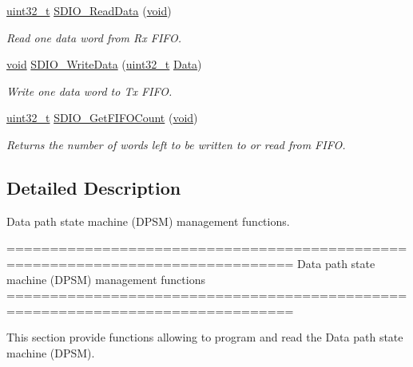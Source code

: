 \begin{DoxyCompactItemize}
\hyperlink{stdint_8h_a435d1572bf3f880d55459d9805097f62}{uint32\-\_\-t} \hyperlink{group___s_d_i_o___group3_ga4e8ac755ef3c31ecd4ed2708df19187e}{S\-D\-I\-O\-\_\-\-Read\-Data} (\hyperlink{group___n_a_m_e_ga18028b8badbf1ea7e704ccac3c488e82}{void})
\begin{DoxyCompactList}\small\item\em Read one data word from Rx F\-I\-F\-O. \end{DoxyCompactList}\item 
\hyperlink{group___n_a_m_e_ga18028b8badbf1ea7e704ccac3c488e82}{void} \hyperlink{group___s_d_i_o___group3_ga361008b5252aa33b5f2b5823ee3d7240}{S\-D\-I\-O\-\_\-\-Write\-Data} (\hyperlink{stdint_8h_a435d1572bf3f880d55459d9805097f62}{uint32\-\_\-t} \hyperlink{group___copter_control_b_l_ga6f3335509cc4943e20df66f72483910c}{Data})
\begin{DoxyCompactList}\small\item\em Write one data word to Tx F\-I\-F\-O. \end{DoxyCompactList}\item 
\hyperlink{stdint_8h_a435d1572bf3f880d55459d9805097f62}{uint32\-\_\-t} \hyperlink{group___s_d_i_o___group3_ga9a3343983a2d68b5164a1c89797d2dd6}{S\-D\-I\-O\-\_\-\-Get\-F\-I\-F\-O\-Count} (\hyperlink{group___n_a_m_e_ga18028b8badbf1ea7e704ccac3c488e82}{void})
\begin{DoxyCompactList}\small\item\em Returns the number of words left to be written to or read from F\-I\-F\-O. \end{DoxyCompactList}\end{DoxyCompactItemize}


\subsection{Detailed Description}
Data path state machine (D\-P\-S\-M) management functions. \begin{DoxyVerb} ===============================================================================
              Data path state machine (DPSM) management functions
 ===============================================================================  

  This section provide functions allowing to program and read the Data path 
  state machine (DPSM).\end{DoxyVerb}
 

